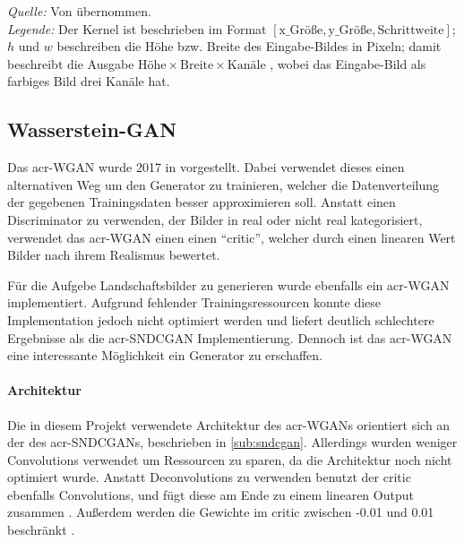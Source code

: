\begin{table}[]
\begin{center}
\begin{minipage}{.5\linewidth}
\begin{tabular}{lcl}
            \bottomrule
        \end{tabular}
    \end{minipage} 
  \end{center}
  \begin{center}
    \bigskip
    \emph{Quelle:} Von \cite[S. 12]{kurach2018gan} übernommen.\\
    \emph{Legende:} Der Kernel ist beschrieben im Format
    $[\text{x\_Größe}, \text{y\_Größe}, \text{Schrittweite}]$;
    $h$ und $w$ beschreiben die Höhe bzw.
    Breite des Eingabe-Bildes in Pixeln; damit beschreibt die Ausgabe
    $\text{Höhe} \times \text{Breite} \times \text{Kanäle}$
    , wobei das Eingabe-Bild als
    farbiges Bild drei Kanäle hat.
  \end{center}
\end{table}
 
 \subsection{Wasserstein-GAN} %
 Das \gls{acr-WGAN} wurde 2017 in  \cite{arjovsky_wasserstein_2017} vorgestellt. Dabei verwendet dieses einen alternativen Weg um den Generator zu trainieren, welcher die Datenverteilung der gegebenen Trainingsdaten besser approximieren soll. Anstatt einen Discriminator zu verwenden, der Bilder in real oder nicht real kategorisiert, verwendet das \gls{acr-WGAN} einen einen \enquote{critic}, welcher durch einen linearen Wert Bilder nach ihrem Realismus bewertet. 
 
 Für die Aufgebe Landschaftsbilder zu generieren wurde ebenfalls ein \gls{acr-WGAN} implementiert. Aufgrund fehlender Trainingsressourcen konnte diese Implementation jedoch nicht optimiert werden und liefert deutlich schlechtere Ergebnisse als die \gls{acr-SNDCGAN} Implementierung. Dennoch ist das \gls{acr-WGAN} eine interessante Möglichkeit ein Generator zu erschaffen.  
 
 \paragraph{Architektur} Die in diesem Projekt verwendete Architektur des \gls{acr-WGAN}s orientiert sich an der des \gls{acr-SNDCGAN}s, beschrieben in \cref{sub:sndcgan}. Allerdings wurden weniger Convolutions verwendet um Ressourcen zu sparen, da die Architektur noch nicht optimiert wurde. Anstatt Deconvolutions zu verwenden benutzt der critic ebenfalls Convolutions, und fügt diese am Ende zu einem linearen Output zusammen \cite{brownlee_how_2019-1}. Außerdem werden die Gewichte im critic zwischen -0.01 und 0.01 beschränkt \cite{arjovsky_wasserstein_2017}. 
 
